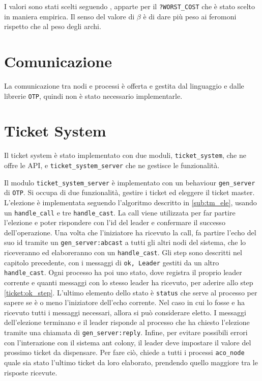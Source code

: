 I valori sono stati scelti seguendo \cite{ILIE2013762}, apparte per il \texttt{?WORST\_COST} che è stato scelto in maniera empirica.
Il senso del valore di $\beta$ è di dare più peso ai feromoni rispetto che al peso degli archi.

\section{Comunicazione}
La comunicazione tra nodi e processi è offerta e gestita dal linguaggio e dalle librerie \texttt{OTP},
quindi non è stato necessario implementarle.

\section{Ticket System}
Il ticket system è stato implementato con due moduli, \texttt{ticket\_system}, che ne offre le API,
e \texttt{ticket\_system\_server} che ne gestisce le funzionalità.

Il modulo \texttt{ticket\_system\_server} è implementato con un behaviour \texttt{gen\_server} di \texttt{OTP}.
Si occupa di due funzionalità, gestire i ticket ed eleggere il ticket master.
L'elezione è implementata seguendo l'algoritmo descritto in \ref{sub:tm_ele}, usando un \texttt{handle\_call} e tre \texttt{handle\_cast}.
La call viene utilizzata per far partire l'elezione e poter rispondere con l'id del leader e confermare il successo dell'operazione.
Una volta che l'iniziatore ha ricevuto la call, fa partire l'echo del suo id tramite un \texttt{gen\_server:abcast} a tutti gli altri
nodi del sistema, che lo riceveranno ed elaboreranno con un \texttt{handle\_cast}. 
Gli step sono descritti nel capitolo precedente, con i messaggi di \texttt{{ok, Leader}} gestiti da un altro
\texttt{handle\_cast}. Ogni processo ha poi uno stato, dove registra il proprio leader corrente e quanti messaggi con lo stesso
leader ha ricevuto, per aderire allo step \ref{ticket:ok_step}. L'ultimo elemento dello stato è \texttt{status}
che serve al processo per sapere se è o meno l'iniziatore dell'echo corrente. Nel caso in cui lo fosse
e ha ricevuto tutti i messaggi necessari, allora si può considerare eletto. I messaggi dell'elezione terminano
e il leader risponde al processo che ha chiesto l'elezione tramite una chiamata di \texttt{gen\_server:reply}.
Infine, per evitare possibili errori con l'interazione con il sistema ant colony, il leader deve impostare
il valore del prossimo ticket da dispensare. Per fare ciò, chiede a tutti i processi \texttt{aco\_node} quale sia
stato l'ultimo ticket da loro elaborato, prendendo quello maggiore tra le risposte ricevute.

